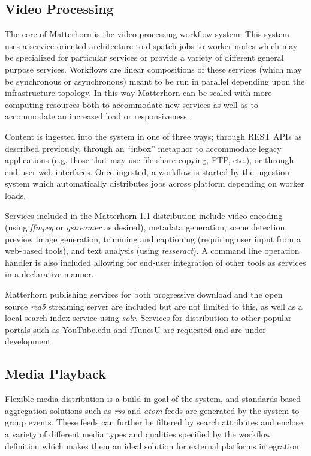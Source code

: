 \documentclass{sig-alternate}
\begin{document}
\subsection{Video Processing}
The core of Matterhorn is the video processing workflow system.  This system uses a service oriented architecture to dispatch jobs to worker nodes which may be specialized for particular services or provide a variety of different general purpose services.  Workflows are linear compositions of these services (which may be synchronous or asynchronous) meant to be run in parallel depending upon the infrastructure topology.  In this way Matterhorn can be scaled with more computing resources both to accommodate new services as well as to accommodate an increased load or responsiveness.

Content is ingested into the system in one of three ways; through REST APIs as described previously, through an ``inbox'' metaphor to accommodate legacy applications (e.g. those that may use file share copying, FTP, etc.), or through end-user web interfaces.  Once ingested, a workflow is started by the ingestion system which automatically distributes jobs across platform depending on worker loads.

Services included in the Matterhorn 1.1 distribution include video encoding (using \emph{ffmpeg} or \emph{gstreamer} as desired), metadata generation, scene detection, preview image generation, trimming and captioning (requiring user input from a web-based tools), and text analysis (using \emph{tesseract}).  A command line operation handler is also included allowing for end-user integration of other tools as services in a declarative manner.

Matterhorn publishing services for both progressive download and the open source \emph{red5} streaming server are included but are not limited to this, as well as a local search index service using \emph{solr}.  Services for distribution to other popular portals such as YouTube.edu and iTunesU are requested and are under development.

\subsection{Media Playback}
Flexible media distribution is a build in goal of the system, and standards-based aggregation solutions such as \emph{rss} and \emph{atom} feeds are generated by the system to group events. These feeds can further be filtered by search attributes and enclose a variety of different media types and qualities specified by the workflow definition which makes them an ideal solution for external platforms integration.
\end{document}
